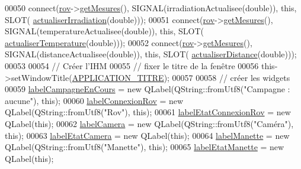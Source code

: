 \begin{DoxyCode}
00050     connect(\hyperlink{class_i_h_m_rov_a777ca33fdb295ba6b6773e880356fa1e}{rov}->\hyperlink{class_rov_a0edd5f7db785bd856b8723fe49ca7848}{getMesures}(), SIGNAL(irradiationActualisee(\textcolor{keywordtype}{double})), \textcolor{keyword}{this}, SLOT(
      \hyperlink{class_i_h_m_rov_a9a5108ce8f73fad9a38d02881ec5ae62}{actualiserIrradiation}(\textcolor{keywordtype}{double})));
00051     connect(\hyperlink{class_i_h_m_rov_a777ca33fdb295ba6b6773e880356fa1e}{rov}->\hyperlink{class_rov_a0edd5f7db785bd856b8723fe49ca7848}{getMesures}(), SIGNAL(temperatureActualisee(\textcolor{keywordtype}{double})), \textcolor{keyword}{this}, SLOT(
      \hyperlink{class_i_h_m_rov_ae5f2c89b06d7dc09e9974428b14799f1}{actualiserTemperature}(\textcolor{keywordtype}{double})));
00052     connect(\hyperlink{class_i_h_m_rov_a777ca33fdb295ba6b6773e880356fa1e}{rov}->\hyperlink{class_rov_a0edd5f7db785bd856b8723fe49ca7848}{getMesures}(), SIGNAL(distanceActualisee(\textcolor{keywordtype}{double})), \textcolor{keyword}{this}, SLOT(
      \hyperlink{class_i_h_m_rov_a891d51cf532d9cc8fc56c63a0c61e663}{actualiserDistance}(\textcolor{keywordtype}{double})));
00053 
00054     \textcolor{comment}{// Créer l'IHM}
00055     \textcolor{comment}{// fixer le titre de la fenêtre}
00056     this->setWindowTitle(\hyperlink{ihmrov_8h_ab599af93fd63f0c5df05b03aa7448eb9}{APPLICATION\_TITRE});
00057 
00058     \textcolor{comment}{// créer les widgets}
00059     \hyperlink{class_i_h_m_rov_a14aa781bc1a446ba6b3ecdea029caa91}{labelCampagneEnCours} = \textcolor{keyword}{new} QLabel(QString::fromUtf8(\textcolor{stringliteral}{"Campagne : aucune"}), \textcolor{keyword}{this});
00060     \hyperlink{class_i_h_m_rov_ac52c67da33e4d4c40b4c485c09452142}{labelConnexionRov} = \textcolor{keyword}{new} QLabel(QString::fromUtf8(\textcolor{stringliteral}{"Rov"}), \textcolor{keyword}{this});
00061     \hyperlink{class_i_h_m_rov_a83a10634509cf2d32a0bcee159eecbc3}{labelEtatConnexionRov} = \textcolor{keyword}{new} QLabel(\textcolor{keyword}{this});
00062     \hyperlink{class_i_h_m_rov_a01cfcfe3e5744cd977bb0416d4e3debe}{labelCamera} = \textcolor{keyword}{new} QLabel(QString::fromUtf8(\textcolor{stringliteral}{"Caméra"}), \textcolor{keyword}{this});
00063     \hyperlink{class_i_h_m_rov_a2ec8f0e6175a73377e4b7e96b4f29b95}{labelEtatCamera} = \textcolor{keyword}{new} QLabel(\textcolor{keyword}{this});
00064     \hyperlink{class_i_h_m_rov_a93259ab27f1eeeacbfe3048a58f475b1}{labelManette} = \textcolor{keyword}{new} QLabel(QString::fromUtf8(\textcolor{stringliteral}{"Manette"}), \textcolor{keyword}{this});
00065     \hyperlink{class_i_h_m_rov_ad62586ec4cef61ef851626515fd0f72a}{labelEtatManette} = \textcolor{keyword}{new} QLabel(\textcolor{keyword}{this});

\end{DoxyCode}
